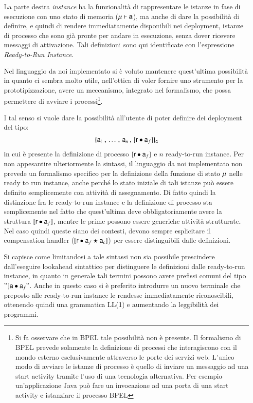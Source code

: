 La parte destra \emph{instance} ha la funzionalità di rappresentare le istanze in
fase di esecuzione con uno stato di memoria (${\sf \mu} \vdash {\sf a}$), ma anche di
dare la possibilità di definire, e quindi di rendere immediatamente disponibili
nei deployment, istanze di processo che sono già pronte per andare in
esecuzione, senza dover ricevere messaggi di attivazione.
Tali definizioni sono qui identificate con l'espressione
\emph{Ready-to-Run Instance}.

Nel linguaggio da noi implementato si è voluto mantenere quest'ultima
possibilità in quanto ci sembra molto utile, nell'ottica di voler fornire uno
strumento per la prototipizzazione, avere un meccanismo, integrato nel
formalismo, che possa permettere di avviare i processi\footnote{Si fa osservare
che in BPEL tale possibilità non è presente. Il formalismo di BPEL prevede
solamente la definizione di processi che interagiscono con il mondo esterno
esclusivamente attraverso le porte dei servizi web. L'unico modo di avviare le
istanze di processo è quello di inviare un messaggio ad una start activity tramite l'uso
di una tecnologia alternativa. Per esempio un'applicazione Java può fare un
invocazione ad una porta di una start activity e istanziare il processo BPEL}.

I tal senso si vuole dare la possibilità all'utente di poter definire dei
deployment del tipo: 
$$
\{ 
{\sf a}_1 \,,\, \ldots \,,\, {\sf a}_n \,,\,
[{\sf r} \bullet {\sf a}_f]  
 \}_{{\sf c}}
$$
in cui è presente la definizione di processo  $[{\sf r} \bullet {\sf a}_f]$ e $n$
ready-to-run instance. Per non appesantire ulteriormente la sintassi, il
linguaggio da noi implementato non prevede un formalismo specifico per la definizione della funzione di stato ${\sf \mu}$ nelle ready to run instance, anche perché lo stato
iniziale di tali istanze può essere definito semplicemente con attività di
assegnamento. Di fatto quindi la distinzione fra le ready-to-run instance e la
definizione di processo sta semplicemente nel fatto che quest'ultima deve
obbligatoriamente avere la struttura  $[{\sf r} \bullet {\sf a}_f]$, mentre le prime
possono essere generiche attività strutturate. Nel caso quindi queste siano dei
contesti, devono sempre esplicitare il compensation handler
($[{\sf r} \bullet {\sf a}_f \star {\sf a}_c]$) per essere distinguibili dalle definizioni.

Si capisce come limitandosi a tale sintassi non sia possibile prescindere
dall'eseguire lookahead sintattico per distinguere le definizioni dalle
ready-to-run instance, in quanto in generale tali termini possono avere prefissi comuni del tipo $"[{\sf a} \bullet {\sf a}_f"$. Anche in questo caso si è preferito
introdurre un nuovo terminale che preposto alle ready-to-run instance le
rendesse immediatamente riconoscibili, ottenendo quindi una grammatica LL(1)
e aumentando la leggibilità dei programmi.

